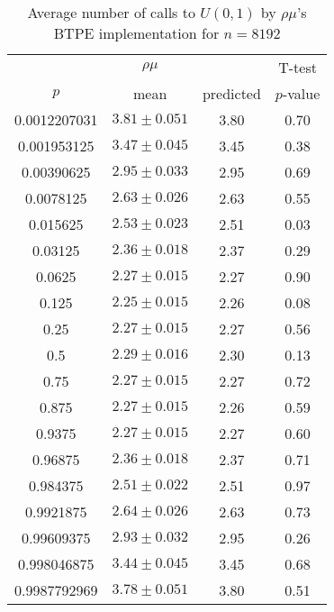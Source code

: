 \begin{table}[t]
\caption{Average number of calls to $U(0,1)$ by $\rho\mu$'s BTPE implementation for $n=8192$}
\label{tab:calls8192}
\begin{tabular}{cccc} \hline
    & $\rho\mu$ & & T-test \\
$p$ & mean & predicted & $p$-value \\ \hline
0.0012207031 & $3.81 \pm 0.051$ & 3.80 & 0.70 \\
0.001953125  & $3.47 \pm 0.045$ & 3.45 & 0.38 \\
0.00390625   & $2.95 \pm 0.033$ & 2.95 & 0.69 \\
0.0078125    & $2.63 \pm 0.026$ & 2.63 & 0.55 \\
0.015625     & $2.53 \pm 0.023$ & 2.51 & 0.03 \\
0.03125      & $2.36 \pm 0.018$ & 2.37 & 0.29 \\
0.0625       & $2.27 \pm 0.015$ & 2.27 & 0.90 \\
0.125        & $2.25 \pm 0.015$ & 2.26 & 0.08 \\
0.25         & $2.27 \pm 0.015$ & 2.27 & 0.56 \\
0.5          & $2.29 \pm 0.016$ & 2.30 & 0.13 \\
0.75         & $2.27 \pm 0.015$ & 2.27 & 0.72 \\
0.875        & $2.27 \pm 0.015$ & 2.26 & 0.59 \\
0.9375       & $2.27 \pm 0.015$ & 2.27 & 0.60 \\
0.96875      & $2.36 \pm 0.018$ & 2.37 & 0.71 \\
0.984375     & $2.51 \pm 0.022$ & 2.51 & 0.97 \\
0.9921875    & $2.64 \pm 0.026$ & 2.63 & 0.73 \\
0.99609375   & $2.93 \pm 0.032$ & 2.95 & 0.26 \\
0.998046875  & $3.44 \pm 0.045$ & 3.45 & 0.68 \\
0.9987792969 & $3.78 \pm 0.051$ & 3.80 & 0.51 \\
\hline
\end{tabular}
\end{table}

